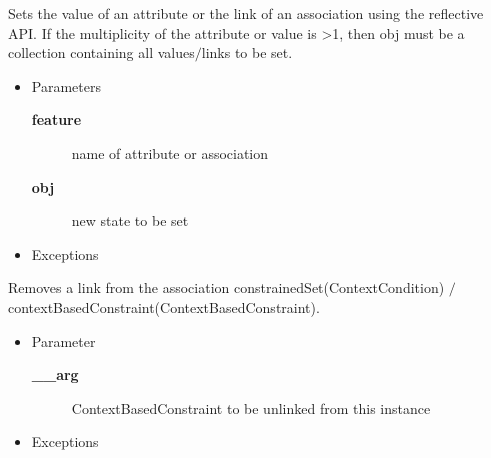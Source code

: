 \begin{desc}Sets the value of an attribute or the link of an association using the
 reflective API. If the multiplicity of the attribute or value is \textgreater  1,
 then obj must be a collection containing all values$/$links to be set.
\begin{itemize}
\item{Parameters
  \begin{description}
   \item[{\bf feature}]{name of attribute or association}
   \item[{\bf obj}]{new state to be set}
  \end{description}}
\end{itemize}
\begin{itemize}
\item{{Exceptions}
}
\end{itemize}
\end{desc}

\begin{desc}Removes a link from the association constrainedSet(ContextCondition)
 $/$ contextBasedConstraint(ContextBasedConstraint).
\begin{itemize}
\item{Parameter
  \begin{description}
   \item[{\bf \_\_arg}]{ContextBasedConstraint to be unlinked from this instance}
  \end{description}}
\end{itemize}
\begin{itemize}
\item{{Exceptions}
}
\end{itemize}
\end{desc}

